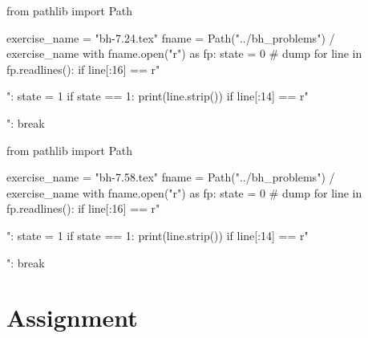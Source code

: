 \begin{pycode}
from pathlib import Path

exercise_name = "bh-7.24.tex"
fname = Path("../bh_problems") / exercise_name
with fname.open("r") as fp:
    state = 0  # dump
    for line in fp.readlines():
        if line[:16] == r"\begin{exercise}":
            state = 1
        if state == 1:
            print(line.strip())
        if line[:14] == r"\end{exercise}":
            break
\end{pycode}

\begin{pycode}
from pathlib import Path

exercise_name = "bh-7.58.tex"
fname = Path("../bh_problems") / exercise_name
with fname.open("r") as fp:
    state = 0  # dump
    for line in fp.readlines():
        if line[:16] == r"\begin{exercise}":
            state = 1
        if state == 1:
            print(line.strip())
        if line[:14] == r"\end{exercise}":
            break
\end{pycode}









\section{Assignment}
\label{sec:assignment}







